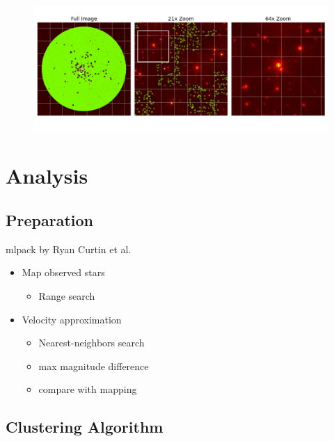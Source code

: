 \documentclass{beamer}
\begin{document}
\begin{frame}
\begin{figure}
\centering
\includegraphics[width=\textwidth,height=\textheight,keepaspectratio]{Images/fits_extracted.png}
\end{figure}
\end{frame}

\section{Analysis}

\subsection{Preparation}
\begin{frame}

mlpack by Ryan Curtin et al.
\\[2ex]
\begin{itemize}
\item Map observed stars 
	\begin{itemize}
	\item Range search
	\end{itemize}
\item Velocity approximation
	\begin{itemize}
	\item Nearest-neighbors search
	\item max magnitude difference
	\item compare with mapping
	\end{itemize}
\end{itemize}

\end{frame}

\subsection{Clustering Algorithm}
\end{document}
